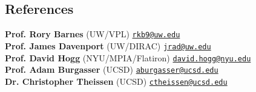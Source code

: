 \documentclass[margin,line]{resume}
\newcommand{\tab}[1]{\hspace{.2667\textwidth}\rlap{#1}}
\newcommand{\itab}[1]{\hspace{0em}\rlap{#1}}
\begin{document}
\begin{resume}


\section{\mysidestyle \textcolor{bcolor}{References}}
\textbf{Prof. Rory Barnes} (UW/VPL) \hfill {\tt \href{rkb9@uw.edu}{rkb9@uw.edu}} \\
\textbf{Prof. James Davenport} (UW/DIRAC) \hfill {\tt \href{jrad@uw.edu}{jrad@uw.edu}} \\
\textbf{Prof. David Hogg} (NYU/MPIA/Flatiron) \hfill {\tt \href{david.hogg@nyu.edu}{david.hogg@nyu.edu}}  \\
\textbf{Prof. Adam Burgasser} (UCSD) \hfill {\tt \href{aburgasser@ucsd.edu}{aburgasser@ucsd.edu}}   \\
\textbf{Dr. Christopher Theissen} (UCSD) \hfill {\tt \href{ctheissen@ucsd.edu}{ctheissen@ucsd.edu}}  
 	       
\end{resume}   
\end{document}
